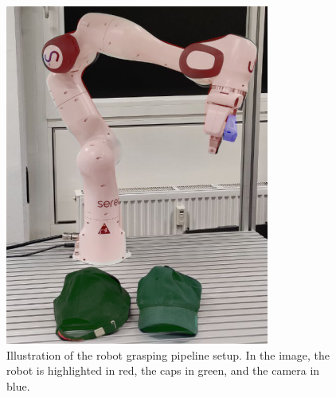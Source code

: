 \begin{figure}[htb]
    \centering
    \includegraphics[scale=0.25]{images/franka.png}
    \caption{Illustration of the robot grasping pipeline setup. In the image, the robot is highlighted in red, the caps in green, and the camera in blue.}
    \label{fig:robot_setup}
\end{figure}